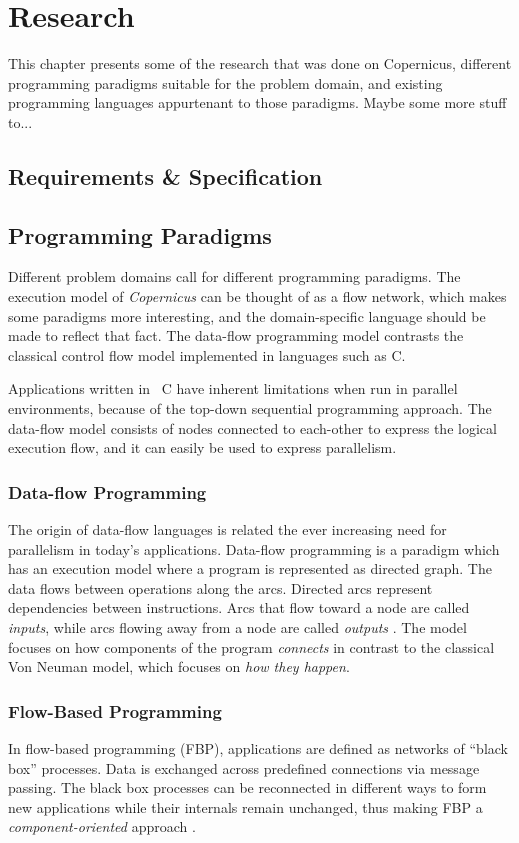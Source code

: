 \chapter{Research}\label{chap:research}
This chapter presents some of the research that was done on
Copernicus, different programming paradigms suitable for the problem
domain, and existing programming languages appurtenant to those
paradigms. Maybe some more stuff to...


\section{Requirements \& Specification}


\section{Programming Paradigms}
Different problem domains call for different programming
paradigms. The execution model of \emph{Copernicus} can be thought of
as a flow network, which makes some paradigms more interesting, and
the domain-specific language should be made to reflect that fact. The
data-flow programming model contrasts the classical control flow model
implemented in languages such as C.

Applications written in \eg~C have inherent limitations when run in
parallel environments, because of the top-down sequential programming
approach. The data-flow model consists of nodes connected to
each-other to express the logical execution flow, and it can easily be
used to express parallelism.


\subsection{Data-flow Programming}
The origin of data-flow languages is related the ever increasing need
for parallelism in today's applications. Data-flow programming is a
paradigm which has an execution model where a program is represented
as directed graph. The data flows between operations along the
arcs. Directed arcs represent dependencies between instructions. Arcs
that flow toward a node are called \emph{inputs}, while arcs flowing
away from a node are called \emph{outputs} \citep{johnston:2004}. The
model focuses on how components of the program \emph{connects} in
contrast to the classical Von Neuman model, which focuses on \emph{how
  they happen}.


\subsection{Flow-Based Programming}
In flow-based programming (FBP), applications are defined as networks
of ``black box'' processes. Data is exchanged across predefined
connections via message passing. The black box processes can be
reconnected in different ways to form new applications while their
internals remain unchanged, thus making FBP a
\emph{component-oriented} approach
\citep{morrison:2010,morrison:online}.


